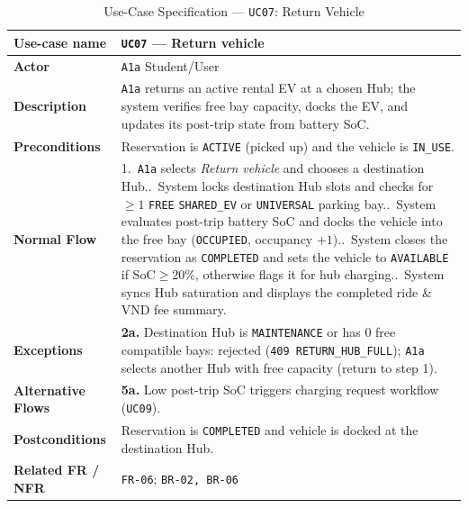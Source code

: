 \begin{table}[H]
  \centering
  \singlespacing\footnotesize
  \caption{Use-Case Specification --- \texttt{UC07}: Return Vehicle}
  \label{tab:uc07}
  \renewcommand{\arraystretch}{1.13}
  \begin{tabularx}{\textwidth}{|L{2.9cm}|Y|}
    \hline
    \textbf{Use-case name} & \textbf{\texttt{UC07} --- Return vehicle} \\
    \hline
    \textbf{Actor} & \texttt{A1a} Student/User \\
    \hline
    \textbf{Description} & \texttt{A1a} returns an active rental EV at a chosen Hub; the system verifies free bay capacity, docks the EV, and updates its post-trip state from battery SoC. \\
    \hline
    \textbf{Preconditions} & Reservation is \texttt{ACTIVE} (picked up) and the vehicle is \texttt{IN\_\allowbreak USE}. \\
    \hline
    \textbf{Normal Flow} & 1.\ \texttt{A1a} selects \textit{Return vehicle} and chooses a destination Hub..\ System locks destination Hub slots and checks for $\ge 1$ \texttt{FREE} \texttt{SHARED\_\allowbreak EV} or \texttt{UNIVERSAL} parking bay..\ System evaluates post-trip battery SoC and docks the vehicle into the free bay (\texttt{OCCUPIED}, occupancy $+1$)..\ System closes the reservation as \texttt{COMPLETED} and sets the vehicle to \texttt{AVAILABLE} if $\text{SoC} \ge 20\%$, otherwise flags it for hub charging..\ System syncs Hub saturation and displays the completed ride \& VND fee summary. \\
    \hline
    \textbf{Exceptions} & \textbf{2a.} Destination Hub is \texttt{MAINTENANCE} or has $0$ free compatible bays: rejected (\texttt{409 RETURN\_\allowbreak HUB\_\allowbreak FULL}); \texttt{A1a} selects another Hub with free capacity (return to step 1). \\
    \hline
    \textbf{Alternative Flows} & \textbf{5a.} Low post-trip SoC triggers charging request workflow (\texttt{UC09}). \\
    \hline
    \textbf{Postconditions} & Reservation is \texttt{COMPLETED} and vehicle is docked at the destination Hub. \\
    \hline
    \textbf{Related FR / NFR} & \texttt{FR-06}; \texttt{BR-02, BR-06} \\
    \hline
  \end{tabularx}
\end{table}

